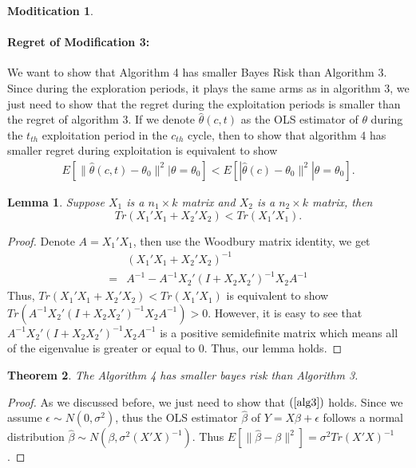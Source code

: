 \documentclass{article}
\newtheorem{theorem}{Theorem}
\newtheorem{lemma}[theorem]{Lemma}
\theoremstyle{plain}
\theoremstyle{definition}
\newtheorem{modification}{Moditication}
\begin{document}
\begin{modification}
\paragraph{Regret of Modification 3:}
We want to show that Algorithm 4 has smaller Bayes Risk than Algorithm 3. Since during the exploration periods, it plays the same arms as in algorithm 3, we just need to show that the regret during the exploitation periods is smaller than the regret of algorithm 3. If we denote $\hat{\theta}(c,t)$ as the OLS estimator of $\theta$ during the $t_{th}$ exploitation period in the $c_{th}$ cycle, then to show that algorithm 4 has smaller regret during exploitation is equivalent to show 
\begin{align}
E[\|\hat{\theta}(c,t)-\theta_{0}\|^{2}|\theta=\theta_{0}] < E[|\hat{\theta}(c)-\theta_{0}\|^{2}|\theta=\theta_{0}]. \label{alg3}
\end{align}
\begin{lemma}
Suppose $X_{1}$ is a $n_{1}\times k $ matrix and $X_{2}$ is a $n_{2}\times k$ matrix, then
\begin{equation}
Tr(X_{1}'X_{1}+X_{2}'X_{2}) < Tr(X_{1}'X_{1}). \nonumber
\end{equation}
\end{lemma}
\begin{proof}
Denote $A=X_{1}'X_{1}$, then use the Woodbury matrix identity, we get
\begin{align}
&(X_{1}'X_{1}+X_{2}'X_{2})^{-1} \nonumber \\
=& A^{-1}-A^{-1}X_{2}'(I+X_{2}X_{2}')^{-1}X_{2}A^{-1} \nonumber 
\end{align}
Thus, $Tr(X_{1}'X_{1}+X_{2}'X_{2}) < Tr(X_{1}'X_{1})$ is equivalent to show $Tr(A^{-1}X_{2}'(I+X_{2}X_{2}')^{-1}X_{2}A^{-1})>0$. However, it is easy to see that $A^{-1}X_{2}'(I+X_{2}X_{2}')^{-1}X_{2}A^{-1}$ is a positive semidefinite matrix which means all of the eigenvalue is greater or equal to 0. Thus, our lemma holds.
\end{proof}

\begin{theorem}
The Algorithm 4 has smaller bayes risk than Algorithm 3.
\end{theorem}
\begin{proof}
As we discussed before, we just need to show that $(\ref{alg3})$ holds. Since we assume $\epsilon\sim N(0,\sigma^{2})$, thus the OLS estimator $\hat{\beta}$ of $Y=X\beta+\epsilon$ follows a normal distribution $\hat{\beta}\sim N(\beta,\sigma^{2}(X'X)^{-1})$. Thus $E[\|\hat{\beta}-\beta\|^{2}]=\sigma^{2}Tr(X'X)^{-1}$. 


\end{proof}
\end{modification}
\end{document}
